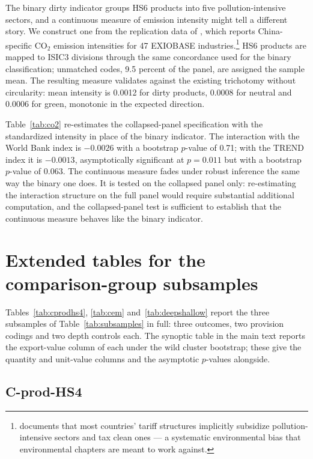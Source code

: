\documentclass[12pt]{article}
\begin{document}
The binary dirty indicator groups HS6 products into five pollution-intensive sectors, and a continuous
measure of emission intensity might tell a different story. We construct one from the replication data
of \citet{shapiro2021}, which reports China-specific CO$_2$ emission intensities for 47 EXIOBASE
industries.\footnote{\citet{shapiro2021} documents that most countries' tariff structures implicitly
subsidize pollution-intensive sectors and tax clean ones --- a systematic environmental bias that
environmental chapters are meant to work against.} HS6 products are mapped to ISIC3 divisions through
the same concordance used for the binary classification; unmatched codes, 9.5 percent of the panel,
are assigned the sample mean. The resulting measure validates against the existing trichotomy without
circularity: mean intensity is 0.0012 for dirty products, 0.0008 for neutral and 0.0006 for green,
monotonic in the expected direction.

Table~\ref{tab:co2} re-estimates the collapsed-panel specification with the standardized intensity in
place of the binary indicator. The interaction with the World Bank index is $-0.0026$ with a bootstrap
$p$-value of 0.71; with the TREND index it is $-0.0013$, asymptotically significant at $p = 0.011$ but
with a bootstrap $p$-value of 0.063. The continuous measure fades under robust inference the same way
the binary one does. It is tested on the collapsed panel only: re-estimating the interaction structure
on the full panel would require substantial additional computation, and the collapsed-panel test is
sufficient to establish that the continuous measure behaves like the binary indicator.



\section{Extended tables for the comparison-group subsamples}\label{app:subsamples}

Tables~\ref{tab:cprodhs4}, \ref{tab:cem} and~\ref{tab:deepshallow} report the three subsamples of
Table~\ref{tab:subsamples} in full: three outcomes, two provision codings and two depth controls each.
The synoptic table in the main text reports the export-value column of each under the wild cluster
bootstrap; these give the quantity and unit-value columns and the asymptotic $p$-values alongside.

\subsection{C-prod-HS4}\label{app:cprodhs4}

\end{document}
